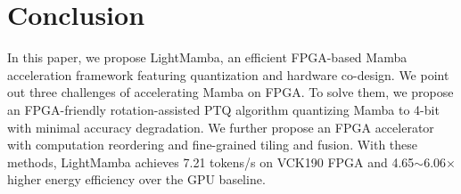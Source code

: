 \section{Conclusion}


In this paper, we propose LightMamba,
an efficient FPGA-based Mamba acceleration framework
featuring quantization and hardware co-design.
We point out three challenges of accelerating Mamba on FPGA.
To solve them, we propose an FPGA-friendly rotation-assisted PTQ algorithm
quantizing Mamba to 4-bit with minimal accuracy degradation.
We further propose an FPGA accelerator with computation reordering 
and fine-grained tiling and fusion.
With these methods, LightMamba achieves 7.21 tokens/s on VCK190 FPGA and 4.65$\sim$6.06$\times$ higher energy efficiency over the GPU baseline.
